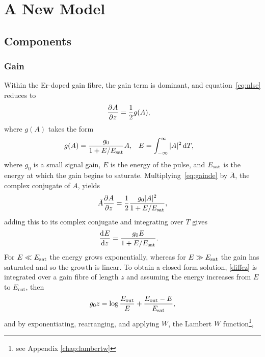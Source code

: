 
\chapter{A New Model}
\section{Components}

\subsection{Gain}
Within the Er-doped gain fibre, the gain term is dominant, and equation~\eqref{eq:nlse} reduces to
\begin{align}
\label{eq:gainde}
\frac{\partial^{}A}{\partial{z}^{}} &= \frac{1}{2} g(A),
\end{align}
where $g(A)$ takes the form \cite{bohun, burgoyne2014, peng, shtyrina, silfvast, yarutkina}
\begin{align}
\label{eq:energy}
	g(A) &= \frac{g_0}{1 + E / E_{\textrm{sat}}} A,& E &= \int_{-\infty}^\infty |A|^2 \, \textrm{d} T,
\end{align}
where $g_0$ is a small signal gain, $E$ is the energy of the pulse, and $E_{\textrm{sat}}$ is the energy at which the gain begins to saturate.
Multiplying~\eqref{eq:gainde} by $\bar{A}$, the complex conjugate of $A$, yields
\begin{align*}
	\bar{A} \frac{\partial^{}A}{\partial{z}^{}} = \frac{1}{2}\frac{g_0 |A|^2}{1 + E / E_{\textrm{sat}}},
\end{align*}
adding this to its complex conjugate and integrating over $T$ gives
\begin{align}
\label{diffez}
	\frac{\textrm{d}^{}E}{\textrm{d}{z}^{}} &= \frac{g_0 E}{1 + E / E_{\textrm{sat}}}.
\end{align}
For $E \ll E_{\textrm{sat}}$ the energy grows exponentially, whereas for $E \gg E_{\textrm{sat}}$ the gain has saturated and so the growth is linear. To obtain a closed form solution, \eqref{diffez} is integrated over a gain fibre of length $z$ and assuming the energy increases from $E$ to $E_{\textrm{out}}$, then
\begin{align*}
	g_0 z = \log\frac{E_{\textrm{out}}}{E} + \frac{E_{\textrm{out}}-E}{E_{\textrm{sat}}},
\end{align*}
and by exponentiating, rearranging, and applying $W$, the Lambert $W$ function\footnote{see Appendix \ref{chap:lambertw}},
